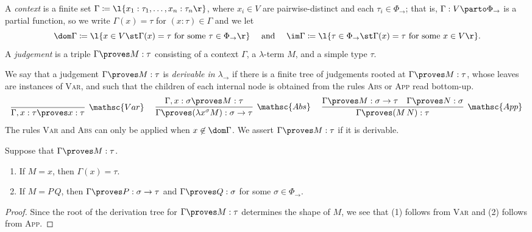\documentclass[reqno]{amsart}
\begin{document}
    \begin{definition}
        A \textit{context} is a finite set $\Gamma\coloneqq\l\{x_1:\tau_1,\dots,x_n:\tau_n\r\}$, where $x_i\in V$ are pairwise-distinct and each $\tau_i\in\Phi_\rightarrow$; that is, $\Gamma:V\parto\Phi_\rightarrow$ is a partial function, so we write $\Gamma(x)=\tau$ for $(x:\tau)\in\Gamma$ and we let
        \begin{equation*}
            \dom\Gamma\coloneqq\l\{x\in V\st\Gamma(x)=\tau\textrm{ for some }\tau\in\Phi_\rightarrow\r\}\ \ \ \ \textrm{and}\ \ \ \ \im\Gamma\coloneqq\l\{\tau\in\Phi_\rightarrow\st\Gamma(x)=\tau\textrm{ for some }x\in V\r\}.
        \end{equation*}
        A \textit{judgement} is a triple $\Gamma\proves M:\tau$ consisting of a context $\Gamma$, a $\lambda$-term $M$, and a simple type $\tau$.
    \end{definition}

    \begin{definition}
        We say that a judgement $\Gamma\proves M:\tau$ is \textit{derivable in $\lambda_\rightarrow$} if there is a finite tree of judgements rooted at $\Gamma\proves M:\tau$, whose leaves are instances of \textsc{Var}, and such that the children of each internal node is obtained from the rules \textsc{Abs} or \textsc{App} read bottom-up.
        \begin{equation*}
            \infer[\mathsc{Var}]{\Gamma,x:\tau\proves x:\tau}{}\ \ \ \ 
            \infer[\mathsc{Abs}]{\Gamma\proves(\lambda x^\sigma M):\sigma\rightarrow\tau}{\Gamma,x:\sigma\proves M:\tau}\ \ \ \ 
            \infer[\mathsc{App}]{\Gamma\proves(M\,N):\tau}{
                \Gamma\proves M:\sigma\rightarrow\tau &
                \Gamma\proves N:\sigma
            }
        \end{equation*}
        The rules \textsc{Var} and \textsc{Abs} can only be applied when $x\not\in\dom\Gamma$. We assert $\Gamma\proves M:\tau$ if it is derivable.
    \end{definition}

    \begin{lemma}\label{lem:simply_typed_generation_1}
        Suppose that $\Gamma\proves M:\tau$.
        \begin{enumerate}
            \item If $M=x$, then $\Gamma(x)=\tau$.
            \item If $M=P\,Q$, then $\Gamma\proves P:\sigma\rightarrow\tau$ and $\Gamma\proves Q:\sigma$ for some $\sigma\in\Phi_\rightarrow$.
        \end{enumerate}
    \end{lemma}
    \begin{proof}
        Since the root of the derivation tree for $\Gamma\proves M:\tau$ determines the shape of $M$, we see that (1) follows from \textsc{Var} and (2) follows from \textsc{App}.
    \end{proof}
\end{document}
